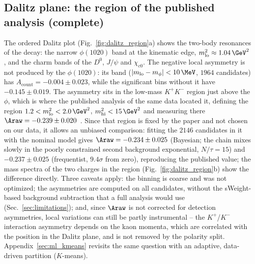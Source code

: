 \subsection{Dalitz plane: the region of the published analysis (complete)}
The ordered Dalitz plot (Fig.~\ref{fig:dalitz_region}a) shows the two-body resonances of the decay: the narrow $\phi(1020)$ band at the kinematic edge, $m^2_{\mathrm{lo}}\approx1.04\,\GeV^2$, and the charm bands of the $D^0$, $J/\psi$ and $\chi_{c0}$. The negative local asymmetry is not produced by the $\phi(1020)$: its band ($|m_{\mathrm{lo}}-m_\phi|<10\,\MeV$, $1964$ candidates) has $A_{\mathrm{count}}=-0.004\pm0.023$, while the significant bins without it have $-0.145\pm0.019$. The asymmetry sits in the low-mass $K^+K^-$ region just above the $\phi$, which is where the published analysis of the same data located it, defining the region $1.2<m^2_{\mathrm{lo}}<2.0\,\GeV^2$, $m^2_{\mathrm{hi}}<15\,\GeV^2$ and measuring there $\Araw=-0.239\pm0.020$~\cite{lhcb_cpv_2013}. Since that region is fixed by the paper and not chosen on our data, it allows an unbiased comparison: fitting the $2146$ candidates in it with the nominal model gives $\Araw=-0.234\pm0.025$ (Bayesian; the chain mixes slowly in the poorly constrained second background exponential, $N/\tau=15$) and $-0.237\pm0.025$ (frequentist, $9.4\sigma$ from zero), reproducing the published value; the mass spectra of the two charges in the region (Fig.~\ref{fig:dalitz_region}b) show the difference directly. Three caveats apply: the binning is coarse and was not optimized; the asymmetries are computed on all candidates, without the sWeight-based background subtraction that a full analysis would use (Sec.~\ref{sec:limitations}); and, since $\Araw$ is not corrected for detection asymmetries, local variations can still be partly instrumental -- the $K^+$/$K^-$ interaction asymmetry depends on the kaon momenta, which are correlated with the position in the Dalitz plane, and is not removed by the polarity split. Appendix~\ref{sec:ml_kmeans} revisits the same question with an adaptive, data-driven partition ($K$-means).

